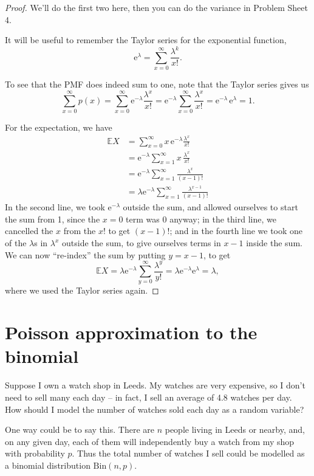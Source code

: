 \documentclass[
  a4paper,
]{book}
\theoremstyle{definition}
\theoremstyle{definition}
\theoremstyle{definition}
\theoremstyle{definition}
\theoremstyle{remark}
\begin{document}
\begin{proof}
We'll do the first two here, then you can do the variance in Problem Sheet 4.

It will be useful to remember the Taylor series for the exponential function,
\[ \mathrm e^\lambda = \sum_{x=0}^\infty \frac{\lambda^k}{x!} . \]

To see that the PMF does indeed sum to one, note that the Taylor series gives us
\[ \sum_{x=0}^\infty p(x) = \sum_{x=0}^\infty \mathrm e^{-\lambda} \frac{\lambda^x}{x!}
= \mathrm e^{-\lambda} \sum_{x=0}^\infty  \frac{\lambda^x}{x!} = \mathrm e^{-\lambda}\,\mathrm e^{\lambda} = 1. \]

For the expectation, we have
\begin{align*}
\mathbb EX &= \sum_{x=0}^\infty x\,\mathrm e^{-\lambda}  \frac{\lambda^x}{x!} \\
  &= \mathrm e^{-\lambda} \sum_{x=1}^\infty x\,\frac{\lambda^x}{x!} \\
  &= \mathrm e^{-\lambda} \sum_{x=1}^\infty \frac{\lambda^x}{(x-1)!} \\
  &= \lambda \mathrm e^{-\lambda} \sum_{x=1}^\infty \frac{\lambda^{x-1}}{(x-1)!}
\end{align*}
In the second line, we took \(\mathrm e^{-\lambda}\) outside the sum, and allowed ourselves to start the sum from 1, since the \(x = 0\) term was 0 anyway; in the third line, we cancelled the \(x\) from the \(x!\) to get \((x-1)!\); and in the fourth line we took one of the \(\lambda\)s in \(\lambda^x\) outside the sum, to give ourselves terms in \(x - 1\) inside the sum. We can now ``re-index'' the sum by putting \(y = x - 1\), to get
\[ \mathbb EX = \lambda \mathrm e^{-\lambda} \sum_{y=0}^\infty \frac{\lambda^{y}}{y!}
= \lambda \mathrm e^{-\lambda} \mathrm e^{\lambda} = \lambda , \]
where we used the Taylor series again.
\end{proof}

\hypertarget{poisson-approx}{%
\section{Poisson approximation to the binomial}\label{poisson-approx}}

Suppose I own a watch shop in Leeds. My watches are very expensive, so I don't need to sell many each day -- in fact, I sell an average of 4.8 watches per day. How should I model the number of watches sold each day as a random variable?

One way could be to say this. There are \(n\) people living in Leeds or nearby, and, on any given day, each of them will independently buy a watch from my shop with probability \(p\). Thus the total number of watches I sell could be modelled as a binomial distribution \(\text{Bin}(n, p)\).
\end{document}
